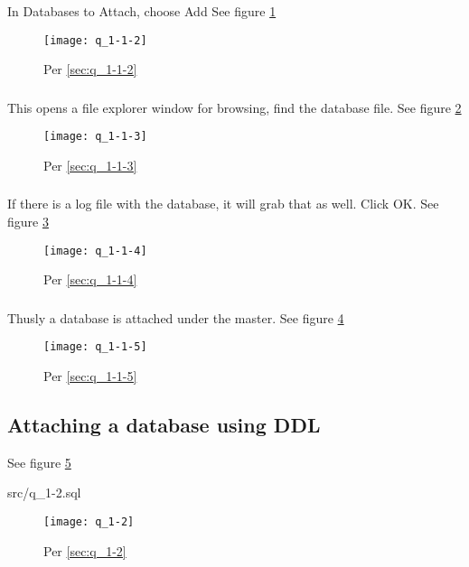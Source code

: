 \documentclass{article}
\begin{document}
\subsubsection{} In Databases to Attach, choose Add \label{sec:q_1-1-2}
See figure \ref{fig:q_1-1-2}
\begin{figure}[H]\centering
	\caption{Per \ref{sec:q_1-1-2}}
	\texttt{[image: q\_1-1-2]}
	\label{fig:q_1-1-2}
\end{figure}
\subsubsection{} This opens a file explorer window for browsing, find the database file.
\label{sec:q_1-1-3}
See figure \ref{fig:q_1-1-3}
\begin{figure}[H]\centering
	\caption{Per \ref{sec:q_1-1-3}}
	\texttt{[image: q\_1-1-3]}
	\label{fig:q_1-1-3}
\end{figure}
\subsubsection{} If there is a log file with the database, it will grab that as well. Click
OK.\label{sec:q_1-1-4}
See figure \ref{fig:q_1-1-4}
\begin{figure}[H]\centering
	\caption{Per \ref{sec:q_1-1-4}}
	\texttt{[image: q\_1-1-4]}
	\label{fig:q_1-1-4}
\end{figure}
\subsubsection{} Thusly a database is attached under the master. \label{sec:q_1-1-5}
See figure \ref{fig:q_1-1-5}
\begin{figure}[H]\centering
	\caption{Per \ref{sec:q_1-1-5}}
	\texttt{[image: q\_1-1-5]}
	\label{fig:q_1-1-5}
\end{figure}

\subsection{Attaching a database using DDL}
See figure \ref{fig:q_1-2}
\label{sec:q_1-2}
\begin{lstinputlisting}[float]{src/q_1-2.sql}
\end{lstinputlisting}
\begin{figure}[H]\centering
	\caption{Per \ref{sec:q_1-2}}
	\texttt{[image: q\_1-2]}
	\label{fig:q_1-2}
\end{figure}
\end{document}
